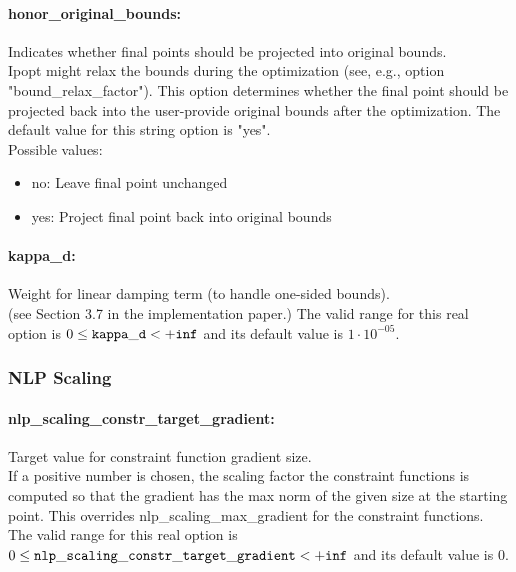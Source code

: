 \paragraph{honor\_original\_bounds:}\label{sec:honor_original_bounds} Indicates whether final points should be projected into original bounds. $\;$ \\
 Ipopt might relax the bounds during the
optimization (see, e.g., option
"bound\_relax\_factor").  This option determines
whether the final point should be projected back
into the user-provide original bounds after the
optimization.
The default value for this string option is "yes".
\\ 
Possible values:
\begin{itemize}
   \item no: Leave final point unchanged
   \item yes: Project final point back into original bounds
\end{itemize}

\paragraph{kappa\_d:}\label{sec:kappa_d} Weight for linear damping term (to handle one-sided bounds). $\;$ \\
 (see Section 3.7 in the implementation paper.) The valid range for this real option is 
$0 \le {\tt kappa\_d } <  {\tt +inf}$
and its default value is $1 \cdot 10^{-05}$.


\subsubsection{NLP Scaling}
\label{sec:NLP_Scaling}

\paragraph{nlp\_scaling\_constr\_target\_gradient:}\label{sec:nlp_scaling_constr_target_gradient} Target value for constraint function gradient size. $\;$ \\
 If a positive number is chosen, the scaling
factor the constraint functions is computed so
that the gradient has the max norm of the given
size at the starting point.  This overrides
nlp\_scaling\_max\_gradient for the constraint
functions. The valid range for this real option is 
$0 \le {\tt nlp\_scaling\_constr\_target\_gradient } <  {\tt +inf}$
and its default value is $0$.


